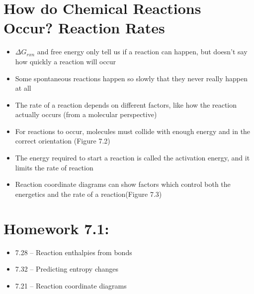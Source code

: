 \documentclass[12pt, openany, letterpaper]{memoir}
\begin{document}
\section{How do Chemical Reactions Occur? Reaction Rates}
\begin{itemize}
	\item $\Delta G_{rxn}$ and free energy only tell us if a reaction can happen, but doesn't say how quickly a reaction will occur
	\item Some spontaneous reactions happen so slowly that they never really happen at all
	\item The rate of a reaction depends on different factors, like how the reaction actually occurs (from a molecular perspective)
	\item For reactions to occur, molecules must collide with enough energy and in the correct orientation (Figure 7.2)
	\item The energy required to start a reaction is called the activation energy, and it limits the rate of reaction
	\item Reaction coordinate diagrams can show factors which control both the energetics and the rate of a reaction(Figure 7.3)
\end{itemize}

\section*{Homework 7.1:}
\begin{itemize}
  \item 7.28 -- Reaction enthalpies from bonds
  \item 7.32 -- Predicting entropy changes
  \item 7.21 -- Reaction coordinate diagrams
\end{itemize}
\end{document}
